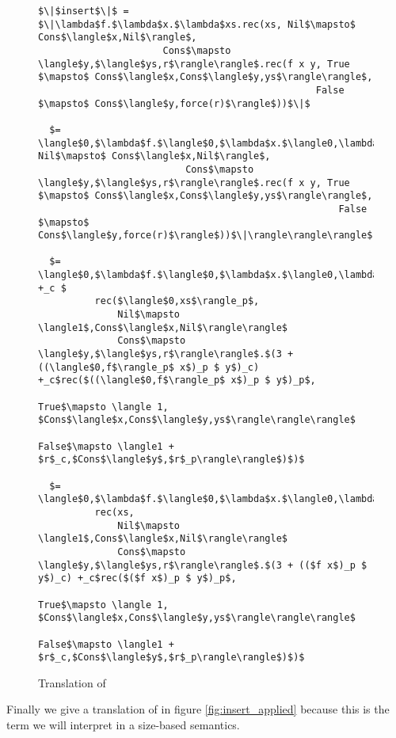 \begin{figure}[H]
\caption{Translation of }
\label{fig:insert}
\begin{lstlisting}
$\|$insert$\|$ = $\|\lambda$f.$\lambda$x.$\lambda$xs.rec(xs, Nil$\mapsto$ Cons$\langle$x,Nil$\rangle$,
                      Cons$\mapsto \langle$y,$\langle$ys,r$\rangle\rangle$.rec(f x y, True $\mapsto$ Cons$\langle$x,Cons$\langle$y,ys$\rangle\rangle$,
                                                 False $\mapsto$ Cons$\langle$y,force(r)$\rangle$))$\|$

  $= \langle$0,$\lambda$f.$\langle$0,$\lambda$x.$\langle0,\lambda$xs.$\|$rec(xs, Nil$\mapsto$ Cons$\langle$x,Nil$\rangle$,
                          Cons$\mapsto \langle$y,$\langle$ys,r$\rangle\rangle$.rec(f x y, True $\mapsto$ Cons$\langle$x,Cons$\langle$y,ys$\rangle\rangle$,
                                                     False $\mapsto$ Cons$\langle$y,force(r)$\rangle$))$\|\rangle\rangle\rangle$

  $= \langle$0,$\lambda$f.$\langle$0,$\lambda$x.$\langle0,\lambda$xs.$\langle$0,xs$\rangle_c +_c $
          rec($\langle$0,xs$\rangle_p$,
              Nil$\mapsto \langle1$,Cons$\langle$x,Nil$\rangle\rangle$
              Cons$\mapsto \langle$y,$\langle$ys,r$\rangle\rangle$.$(3 + ((\langle$0,f$\rangle_p$ x$)_p $ y$)_c) +_c$rec($((\langle$0,f$\rangle_p$ x$)_p $ y$)_p$,
                                                   True$\mapsto \langle 1, $Cons$\langle$x,Cons$\langle$y,ys$\rangle\rangle\rangle$
                                                   False$\mapsto \langle1 + $r$_c,$Cons$\langle$y$,$r$_p\rangle\rangle$)$)$

  $= \langle$0,$\lambda$f.$\langle$0,$\lambda$x.$\langle0,\lambda$xs.
          rec(xs,
              Nil$\mapsto \langle1$,Cons$\langle$x,Nil$\rangle\rangle$
              Cons$\mapsto \langle$y,$\langle$ys,r$\rangle\rangle$.$(3 + (($f x$)_p $ y$)_c) +_c$rec($($f x$)_p $ y$)_p$,
                                                 True$\mapsto \langle 1, $Cons$\langle$x,Cons$\langle$y,ys$\rangle\rangle\rangle$
                                                 False$\mapsto \langle1 + $r$_c,$Cons$\langle$y$,$r$_p\rangle\rangle$)$)$
\end{lstlisting}
\end{figure}


Finally we give a translation of  in figure \ref{fig:insert_applied} because this is the term we will interpret in a size-based semantics.

